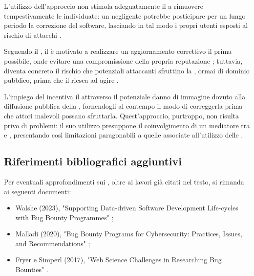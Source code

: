 L'utilizzo dell'approccio \fullvendordisclosure non stimola adeguatamente il \BI a rimuovere tempestivamente le \vulnerability individuate: un \BI negligente potrebbe posticipare per un lungo periodo la correzione del software, lasciando in tal modo i propri utenti esposti al rischio di attacchi \cite{lisi2022ard, cavusoglu2007vulndisc}.

\medskip

Seguendo il \fullpublicdisclosure, il \BI è motivato a realizzare un aggiornamento correttivo il prima possibile, onde evitare una compromissione della propria reputazione \cite{cavusoglu2007vulndisc, arora2010vulndisc}; tuttavia, diventa concreto il rischio che potenziali attaccanti sfruttino la \vulnerability, ormai di dominio pubblico, prima che il \BI riesca ad agire \cite{lisi2022ard, cavusoglu2007vulndisc, arora2010vulndisc}.

\medskip

L'impiego del \responsibledisclosure incentiva il \BI attraverso il potenziale danno di immagine dovuto alla diffusione pubblica della \vulnerability, fornendogli al contempo il modo di correggerla prima che attori malevoli possano sfruttarla. Quest'approccio, purtroppo, non risulta privo di problemi: il suo utilizzo presuppone il coinvolgimento di un mediatore tra \BI e \BH, presentando così limitazioni paragonabili a quelle associate all'utilizzo delle \bugbountyplatform.

\subsection{Riferimenti bibliografici aggiuntivi}


Per eventuali approfondimenti sui \BBP, oltre ai lavori già citati nel testo, si rimanda ai seguenti documenti: 
\begin{itemize}

\item Walshe (2023), "Supporting Data-driven Software Development Life-cycles with Bug Bounty Programmes" \cite{walshe2023bountythesis};

\item Malladi \etAl (2020), "Bug Bounty Programs for Cybersecurity: Practices, Issues, and Recommendations" \cite{malladi2020bugbounty};

\item Fryer e Simperl (2017), "Web Science Challenges in Researching Bug Bounties" \cite{fryer2017bugbounty}.

\end{itemize}

